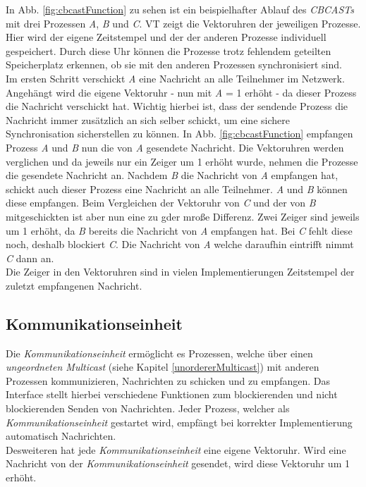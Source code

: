In Abb. \ref{fig:cbcastFunction} zu sehen ist ein beispielhafter Ablauf des \textit{CBCASTs} mit drei Prozessen \textit{A}, \textit{B} und \textit{C}. VT zeigt die Vektoruhren der jeweiligen Prozesse. Hier wird der eigene Zeitstempel und der der anderen Prozesse individuell gespeichert. Durch diese Uhr können die Prozesse trotz fehlendem geteilten Speicherplatz erkennen, ob sie mit den anderen Prozessen synchronisiert sind.\\
Im ersten Schritt verschickt \textit{A} eine Nachricht an alle Teilnehmer im Netzwerk. Angehängt wird die eigene Vektoruhr - nun mit \textit{A} = 1 erhöht - da dieser Prozess die Nachricht verschickt hat. Wichtig hierbei ist, dass der sendende Prozess die Nachricht immer zusätzlich an sich selber schickt, um eine sichere Synchronisation sicherstellen zu können. In Abb. \ref{fig:cbcastFunction} empfangen Prozess \textit{A} und \textit{B} nun die von \textit{A} gesendete Nachricht. Die Vektoruhren werden verglichen und da jeweils nur ein Zeiger um 1 erhöht wurde, nehmen die Prozesse die gesendete Nachricht an. Nachdem \textit{B} die Nachricht von \textit{A} empfangen hat, schickt auch dieser Prozess eine Nachricht an alle Teilnehmer. \textit{A} und \textit{B} können diese empfangen. Beim Vergleichen der Vektoruhr von \textit{C} und der von \textit{B} mitgeschickten ist aber nun eine zu gder mroße Differenz. Zwei Zeiger sind jeweils um 1 erhöht, da \textit{B} bereits die Nachricht von \textit{A} empfangen hat. Bei \textit{C} fehlt diese noch, deshalb blockiert \textit{C}. Die Nachricht von \textit{A} welche daraufhin eintrifft nimmt \textit{C} dann an.\\
Die Zeiger in den Vektoruhren sind in vielen Implementierungen Zeitstempel der zuletzt empfangenen Nachricht.\\

\subsection{Kommunikationseinheit}

Die \textit{Kommunikationseinheit} ermöglicht es Prozessen, welche über einen \textit{ungeordneten Multicast} (siehe Kapitel \ref{unordererMulticast}) mit anderen Prozessen kommunizieren, Nachrichten zu schicken und zu empfangen. Das Interface stellt hierbei verschiedene Funktionen zum blockierenden und nicht blockierenden Senden von Nachrichten. Jeder Prozess, welcher als \textit{Kommunikationseinheit} gestartet wird, empfängt bei korrekter Implementierung automatisch Nachrichten.\\
Desweiteren hat jede \textit{Kommunikationseinheit} eine eigene Vektoruhr. Wird eine Nachricht von der \textit{Kommunikationseinheit} gesendet, wird diese Vektoruhr um 1 erhöht.

